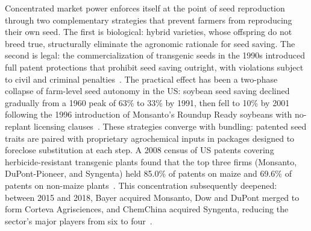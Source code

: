 Concentrated market power enforces itself at the point of seed reproduction through two complementary strategies that prevent farmers from reproducing their own seed. The first is biological: hybrid varieties, whose offspring do not breed true, structurally eliminate the agronomic rationale for seed saving. The second is legal: the commercialization of transgenic seeds in the 1990s introduced full patent protections that prohibit seed saving outright, with violations subject to civil and criminal penalties~\cite[Section~2.1, p.~1268]{howard2009consolidation}. The practical effect has been a two-phase collapse of farm-level seed autonomy in the US: soybean seed saving declined gradually from a 1960 peak of 63\% to 33\% by 1991, then fell to 10\% by 2001 following the 1996 introduction of Monsanto's Roundup Ready soybeans with no-replant licensing clauses~\cite[pp.~128--129, Figure~1]{mascarenhas2006seeds}. These strategies converge with bundling: patented seed traits are paired with proprietary agrochemical inputs in packages designed to foreclose substitution at each step. A 2008 census of US patents covering herbicide-resistant transgenic plants found that the top three firms (Monsanto, DuPont-Pioneer, and Syngenta) held 85.0\% of patents on maize and 69.6\% of patents on non-maize plants~\cite[Table~1, pp.~121--122]{glenna2009agribusiness}. This concentration subsequently deepened: between 2015 and 2018, Bayer acquired Monsanto, Dow and DuPont merged to form Corteva Agrisciences, and ChemChina acquired Syngenta, reducing the sector's major players from six to four~\cite[Abstract, p.~129]{deconinck2020concentration}.

